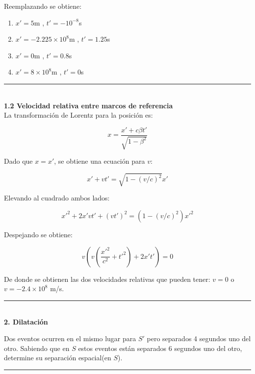 \documentclass[12pt]{article}
\begin{document}
 Reemplazando se obtiene:
 
 \begin{enumerate}
 	\item $x'=5$m , $t'=-10^{-8}$s
	\item $x'=-2.225\times 10^{8}$m , $t'=1.25$s
	\item $x'=0$m , $t'=0.8$s
 	\item $x'=8 \times 10^8$m , $t'=0$s
 \end{enumerate}

\noindent\rule{16.5cm}{0.4pt}\\ 
\textbf{1.2 Velocidad relativa entre marcos de referencia}\\

La transformación de Lorentz para la posición es:

 
 \begin{equation}
 x  = \frac{x'+  c \beta  t'}{\sqrt{1-\beta^2}}
 \end{equation}
 
 Dado que $x = x'$, se obtiene una ecuación para $v$:
 
 \begin{equation}
 x'+  v  t' = \sqrt{1-(v/c)^2} x'
 \end{equation}
 
 Elevando al cuadrado ambos lados:
 
 
  \begin{equation}
 x'^2+ 2x'v  t' +(v  t')^2 = (1-(v/c)^2)x'^2
 \end{equation}
 
 Despejando se obtiene:
 
  \begin{equation}
 v\left( v\left( \frac{x'^2}{c^2} + t'^2\right) + 2x't'\right) = 0
 \end{equation}
 
 De donde se obtienen las dos velocidades relativas que pueden tener: $v=0$ o $v=-2.4\times 10^8$ m/s.\\ 
 
 
 
 \color{ForestGreen}
\noindent\rule{16.5cm}{0.4pt}\\
\textbf{2. Dilatación}

Dos eventos ocurren en el mismo lugar para $S'$ pero separados 4 segundos uno del otro. Sabiendo que en $S$ estos eventos están separados 6 segundos uno del otro, determine su separación espacial(en $S$).\\
\noindent\rule{16.5cm}{0.4pt}
\color{Black}
\end{document}
